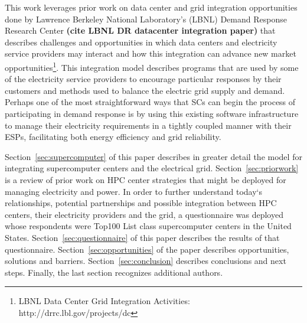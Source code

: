 This work leverages prior work on data center and grid integration opportunities
done by Lawrence Berkeley National Laboratory's (LBNL) Demand Response 
Research Center \textbf{(cite LBNL DR datacenter integration paper)}
that describes challenges and opportunities in which data centers and electricity
service providers may interact and how this integration can advance 
new market 
opportunities\footnote{LBNL Data Center Grid Integration Activities: http://drrc.lbl.gov/projects/dc}.
This integration model describes programs that are used by some of the electricity 
service providers to encourage particular responses by their customers and methods 
used to balance the electric grid supply and demand.
Perhaps one of the most straightforward ways that SCs can begin
the process of participating in demand response is by using this existing software 
infrastructure to manage their electricity requirements in a tightly coupled manner 
with their ESPs, facilitating both energy efficiency and grid reliability.

Section~\ref{sec:supercomputer}  of this paper describes in greater detail the model for
integrating supercomputer centers and the electrical grid. Section~\ref{sec:priorwork}
is a review of prior work on HPC center strategies that might be
deployed for managing electricity and power. In order to further understand
today`s relationships, potential partnerships and possible integration
between HPC centers, their electricity providers and the grid, a
questionnaire was deployed whose respondents were Top100 List class
supercomputer centers in the United States. Section~\ref{sec:questionnaire} of this paper
describes the results of that questionnaire. Section~\ref{sec:opportunities} of the paper
describes opportunities, solutions and barriers. Section~\ref{sec:conclusion} describes
conclusions and next steps. Finally, the last section recognizes additional
authors.

